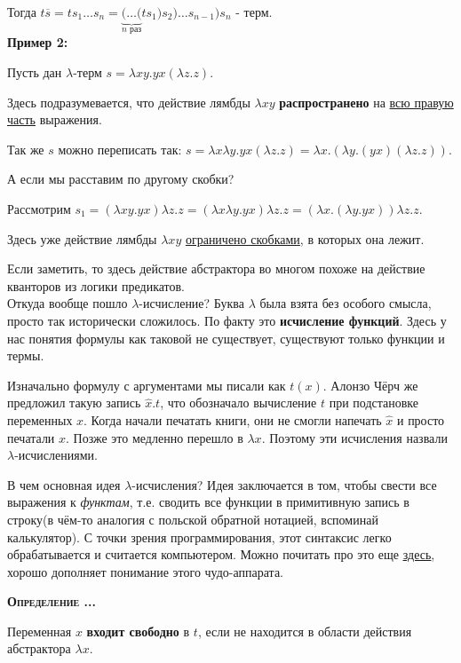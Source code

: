 \documentclass[18pt, a4paper]{extarticle}
\newcounter{par}
\newcounter{spar}
\newcounter{zap}
\newcommand{\opr}{\textbf{\textsc{Определение \thepar.\if\thespar1\thespar.\fi\thezap.\;}}\stepcounter{zap}}
\newcommand{\primerT}[1]{\textbf{Пример #1:\;}}
\newcommand{\ovl}[1]{\overline{#1}}
\newcommand{\lod}[3]{#1_#2\dots#1_#3}
\newcommand{\lm}{\lambda}
\begin{document}
Тогда $t\ovl s=t\lod s 1 n=\underset{n\text{ раз}}{\underbrace{(\dots(}}t s_1)s_2)\dots s_{n-1})s_n$ - терм.\\

\primerT 2

Пусть дан $\lm$-терм $s=\lm xy.yx(\lm z.z)$.

Здесь подразумевается, что действие лямбды $\lm xy$ \textbf{распространено} на \underline{всю правую часть} выражения.

Так же $s$ можно переписать так: $s=\lm x\lm y.yx(\lm z.z)=\lm x.(\lm y.(yx)(\lm z.z))$.

А если мы расставим по другому скобки? 

Рассмотрим $s_1=(\lm xy.yx)\lm z.z=(\lm x\lm y.yx)\lm z.z=(\lm x.(\lm y.yx))\lm z.z$.

Здесь уже действие лямбды $\lm xy$ \underline{ограничено скобками}, в которых она лежит.

Если заметить, то здесь действие абстрактора во многом похоже на действие кванторов из логики предикатов.\\

Откуда вообще пошло $\lm$-исчисление? Буква $\lm$ была взята без особого смысла, просто так исторически сложилось. По факту это \textbf{исчисление функций}. Здесь у нас понятия формулы как таковой не существует, существуют только функции и термы. 

Изначально формулу с аргументами мы писали как \textbf {$t(x)$}. Алонзо Чёрч же предложил такую запись $\hat x.t$, что обозначало вычисление $t$ при подстановке переменных $x$. Когда начали печатать книги, они не смогли напечать $\hat x$ и просто печатали \scalebox{0.6}{$\wedge$}$x$. Позже это медленно перешло в $\lm x$. Поэтому эти исчисления назвали $\lm$-исчислениями.

В чем основная идея $\lm$-исчисления? Идея заключается в том, чтобы свести все выражения к \textit{функтам}, т.е. сводить все функции в примитивную запись в строку(в чём-то аналогия с польской обратной нотацией, вспоминай калькулятор). С точки зрения программирования, этот синтаксис легко обрабатывается и считается компьютером. Можно почитать про это еще \href{https://habr.com/ru/post/215807/}{\underline{здесь}}, хорошо дополняет понимание этого чудо-аппарата.\\
\newpage

\opr 

Переменная $x$ \textbf{входит свободно} в $t$, если не находится в области действия абстрактора $\lm x$. 
\end{document}

